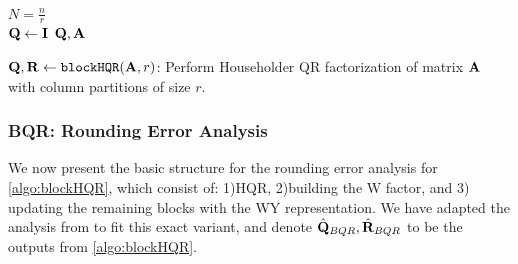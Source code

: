 \begin{algorithm2e}
	\DontPrintSemicolon %
	$N=\frac{n}{r}$\\
	$\mathbf{Q}\gets \mathbf{I}$
	\Return $\mathbf{Q},\mathbf{A}$
	\caption{\label{algo:blockHQR} $\mathbf{Q},\mathbf{R}\gets {\tt blockHQR}(\mathbf{A}, r)$: Perform Householder QR factorization of matrix $\mathbf{A}$ with column partitions of size $r$.}
\end{algorithm2e}
\subsubsection{BQR: Rounding Error Analysis}\label{sec:BQRerr}
We now present the basic structure for the rounding error analysis for \cref{algo:blockHQR}, which consist of: 1)HQR, 2)building the W factor, and 3) updating the remaining blocks with the WY representation.
We have adapted the analysis from \cite{Higham2002} to fit this exact variant, and denote $\hat{\mathbf{Q}}_{BQR},\hat{\mathbf{R}}_{BQR}$ to be the outputs from \cref{algo:blockHQR}.
